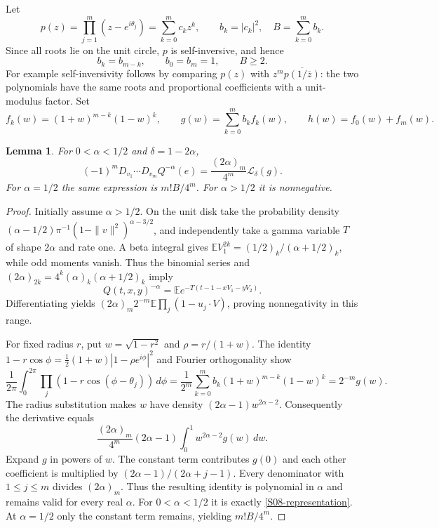 \documentclass[11pt,a4paper]{article}
\newtheorem{lemma}[theorem]{Lemma}
\theoremstyle{definition}\newtheorem{definition}[theorem]{Definition}
\theoremstyle{remark}\newtheorem{remark}[theorem]{Remark}
\numberwithin{equation}{section}
\begin{document}
Let
\[
 p(z)=\prod_{j=1}^m(z-e^{i\theta_j})=\sum_{k=0}^mc_kz^k,
 \qquad b_k=|c_k|^2,\quad B=\sum_{k=0}^mb_k.
\]
Since all roots lie on the unit circle, $p$ is self-inversive, and hence
\begin{equation}\label{S08-self}
 b_k=b_{m-k},\qquad b_0=b_m=1,\qquad B\ge2.
\end{equation}
For example self-inversivity follows by comparing $p(z)$ with $z^m\overline{p(1/\overline z)}$: the two polynomials have the same roots and proportional coefficients with a unit-modulus factor.
Set
\[
 f_k(w)=(1+w)^{m-k}(1-w)^k,\qquad
 g(w)=\sum_{k=0}^mb_k f_k(w),\qquad h(w)=f_0(w)+f_m(w).
\]
\begin{lemma}\label{S08-rep}
For $0<\alpha<1/2$ and $\delta=1-2\alpha$,
\begin{equation}\label{S08-representation}
 (-1)^mD_{v_1}\cdots D_{v_m}Q^{-\alpha}(e)
 =\frac{(2\alpha)_m}{4^m}\mathcal L_\delta(g).
\end{equation}
For $\alpha=1/2$ the same expression is $m!B/4^m$. For $\alpha>1/2$ it is nonnegative.
\end{lemma}
\begin{proof}
Initially assume $\alpha>1/2$. On the unit disk take the probability density
$(\alpha-1/2)\pi^{-1}(1-\|v\|^2)^{\alpha-3/2}$, and independently take a gamma variable $T$ of shape $2\alpha$ and rate one. A beta integral gives
$\mathbb E V_1^{2k}=(1/2)_k/(\alpha+1/2)_k$, while odd moments vanish. Thus the binomial series and
$(2\alpha)_{2k}=4^k(\alpha)_k(\alpha+1/2)_k$ imply
\[
 Q(t,x,y)^{-\alpha}=\mathbb E e^{-T(t-1-xV_1-yV_2)}.
\]
Differentiating yields $(2\alpha)_m2^{-m}\mathbb E\prod_j(1-u_j\cdot V)$, proving nonnegativity in this range.

For fixed radius $r$, put $w=\sqrt{1-r^2}$ and $\rho=r/(1+w)$. The identity
$1-r\cos\phi=\tfrac12(1+w)|1-\rho e^{i\phi}|^2$
and Fourier orthogonality show
\[
 \frac1{2\pi}\int_0^{2\pi}\prod_j(1-r\cos(\phi-\theta_j))\,d\phi
 =\frac1{2^m}\sum_{k=0}^mb_k(1+w)^{m-k}(1-w)^k
 =2^{-m}g(w).
\]
The radius substitution makes $w$ have density $(2\alpha-1)w^{2\alpha-2}$. Consequently the derivative equals
\[
 \frac{(2\alpha)_m}{4^m}(2\alpha-1)\int_0^1w^{2\alpha-2}g(w)\,dw.
\]
Expand $g$ in powers of $w$. The constant term contributes $g(0)$ and each other coefficient is multiplied by $(2\alpha-1)/(2\alpha+j-1)$. Every denominator with $1\le j\le m$ divides $(2\alpha)_m$. Thus the resulting identity is polynomial in $\alpha$ and remains valid for every real $\alpha$. For $0<\alpha<1/2$ it is exactly \eqref{S08-representation}. At $\alpha=1/2$ only the constant term remains, yielding $m!B/4^m$.
\end{proof}
\end{document}

